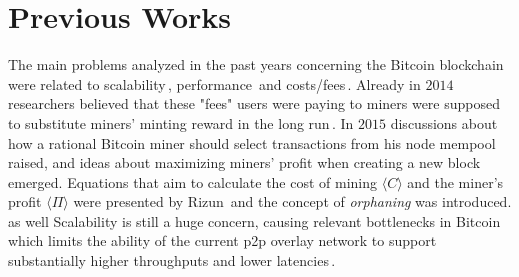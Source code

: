 \documentclass[USenglish]{uit-thesis}
\begin{document}
\section{Previous Works}
\label{sec:relatedworks}
The main problems analyzed in the past years
concerning the Bitcoin blockchain were related
to scalability\,\cite{Rizun:2015:blocksizelimit, croman2016},
performance\,\cite{croman2016, Decker2013IPBN} and
costs/fees\,\cite{Rizun:2015:blocksizelimit, Moser2015}.
Already in $2014$ researchers believed that
these "fees" users were paying to miners
were supposed to substitute miners' minting
reward in the long run\,\cite{Moser2015}.
In $2015$ discussions about how a rational
Bitcoin miner should select transactions from
his node mempool raised, and ideas about
maximizing miners' profit when creating a new block
emerged. Equations that aim to calculate the
cost of mining $\langle C \rangle$
and the miner's profit $\langle \Pi \rangle$ were
presented by Rizun\,\cite{Rizun:2015:blocksizelimit} and
the concept of \emph{orphaning} was introduced. as well
Scalability is still a huge concern,
causing relevant bottlenecks in Bitcoin which
limits the ability of the current \gls{p2p}
overlay network to support substantially higher
throughputs and lower latencies\,\cite{croman2016}.
\end{document}
